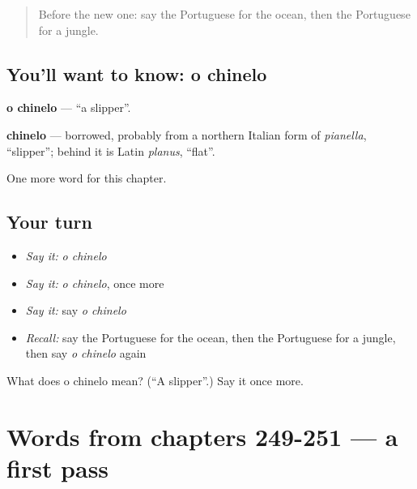 \begin{quote}
Before the new one: say the Portuguese for the ocean, then the Portuguese for a jungle.
\end{quote}

\subsection*{You'll want to know: o chinelo}
\textbf{o chinelo} — \textquotedblleft{}a slipper\textquotedblright{}.

\begin{cousinweb}
\textbf{chinelo} — borrowed, probably from a northern Italian form of \emph{pianella}, \textquotedblleft{}slipper\textquotedblright{}; behind it is Latin \emph{planus}, \textquotedblleft{}flat\textquotedblright{}.
\end{cousinweb}

\begin{grammarlens}[title={What you've built}]
One more word for this chapter.
\end{grammarlens}

\subsection*{Your turn}
\begin{itemize}
\raggedright
  \item \emph{Say it:} \emph{o chinelo}
  \item \emph{Say it:} \emph{o chinelo}, once more
  \item \emph{Say it:} say \emph{o chinelo}
  \item \emph{Recall:} say the Portuguese for the ocean, then the Portuguese for a jungle, then say \emph{o chinelo} again
\end{itemize}

\begin{tcolorbox}[breakable,colback=teal!4,colframe=teal!35!black,title={Before you move on}]
What does o chinelo mean? (\textquotedblleft{}A slipper\textquotedblright{}.) Say it once more.
\end{tcolorbox}
\section[(dialogue)]{Words from chapters 249-251 — a first pass}

\label{lesson:PT-R255-first-pass-words-from-chapters-249-251}



